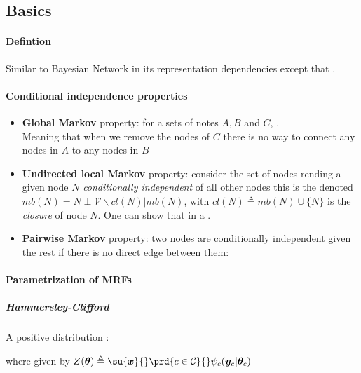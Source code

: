 \subsection{Basics}
\paragraph{Defintion}
Similar to Bayesian Network in its representation dependencies except that . 

\paragraph{Conditional independence properties}
\begin{itemize}
    \item \textbf{Global Markov} property: for a sets of notes $A, B$ and $C$, .\\
        Meaning that when we remove the nodes of $C$ there is no way to connect any nodes in $A$ to
        any nodes in $B$
    \item \textbf{Undirected local Markov} property: consider the set of nodes rending a given node
        $N$ \emph{conditionally independent} of all other nodes this is the 
        denoted $mb(N) = N\perp\mathcal{V}\backslash cl(N)|mb(N)$, with $cl(N)\triangleq mb(N)\cup
        \{N\}$ is the \textit{closure} of node $N$. One can show that in a .
    \item \textbf{Pairwise Markov} property: two nodes are conditionally independent given the rest
        if there is no direct edge between them: 
\end{itemize}

\paragraph{Parametrization of MRFs}
\subparagraph{Hammersley-Clifford}
A positive distribution : 
\begin{center}
\end{center}
where  given by $Z(\bm{\theta}) \triangleq \su{\bm{x}}{}\prd{c\in\mathcal{C}}{}\psi_{c}(\bm{y}_{c}|\bm{\theta}_{c})$

